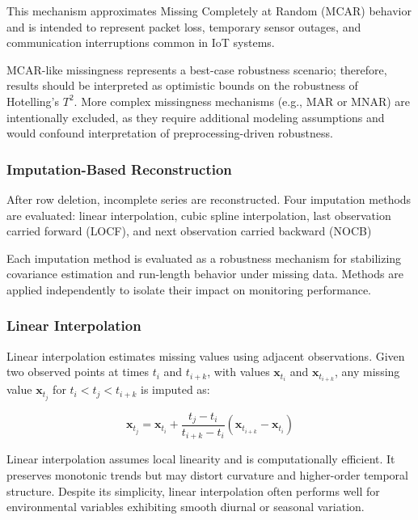 This mechanism approximates Missing Completely at Random (\ac{MCAR}) behavior and is intended to represent packet loss, temporary sensor outages, and communication interruptions common in \ac{IoT} systems.

MCAR-like missingness represents a best-case robustness scenario; therefore, results should be interpreted as optimistic bounds on the robustness of Hotelling’s $T^2$.
More complex missingness mechanisms (e.g., \ac{MAR} or \ac{MNAR}) are intentionally excluded, as they require additional modeling assumptions and would confound interpretation of preprocessing-driven robustness.

\subsubsection{Imputation-Based Reconstruction}

After row deletion, incomplete series are reconstructed. Four imputation methods are evaluated: linear interpolation, cubic spline interpolation, last observation carried forward (\ac{LOCF}), and next observation carried backward (\ac{NOCB})

Each imputation method is evaluated as a robustness mechanism for stabilizing covariance estimation and run-length behavior under missing data.
Methods are applied independently to isolate their impact on monitoring performance.

\subsubsection{Linear Interpolation}

Linear interpolation estimates missing values using adjacent observations.
Given two observed points at times \(t_i\) and \(t_{i+k}\), with values \(\mathbf{x}_{t_i}\) and \(\mathbf{x}_{t_{i+k}}\), any missing value \(\mathbf{x}_{t_j}\) for \(t_i < t_j < t_{i+k}\) is imputed as:

\begin{equation}
\mathbf{x}_{t_j} = \mathbf{x}_{t_i} +
\frac{t_j - t_i}{t_{i+k} - t_i}
\left(\mathbf{x}_{t_{i+k}} - \mathbf{x}_{t_i}\right)
\end{equation}

Linear interpolation assumes local linearity and is computationally efficient. It preserves monotonic trends but may distort curvature and higher-order temporal structure. Despite its simplicity, linear interpolation often performs well for environmental variables exhibiting smooth diurnal or seasonal variation.


